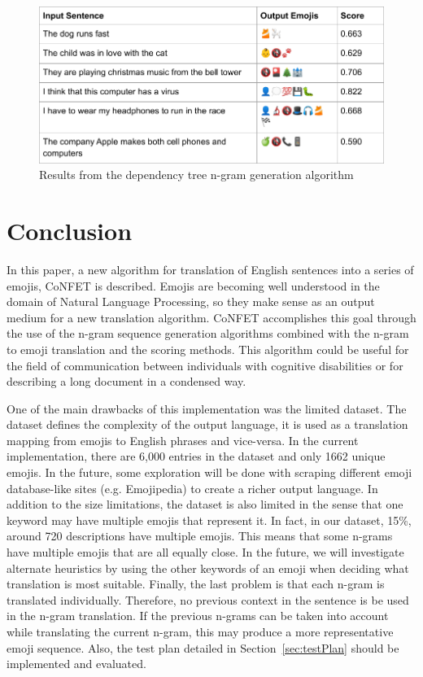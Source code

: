 \documentclass{article}[10]
\begin{document}
\begin{figure}[H]
  \begin{center}
    \includegraphics[width=\columnwidth]{figures/dependency.png}
      \caption{Results from the dependency tree n-gram generation algorithm\label{fig:dependency}}
  \end{center}
\end{figure}

\section{Conclusion}

In this paper, a new algorithm for translation of English sentences
into a series of emojis, CoNFET is described. Emojis are becoming well
understood in the domain of Natural Language Processing, so they make
sense as an output medium for a new translation algorithm. CoNFET
accomplishes this goal through the use of the n-gram sequence generation
algorithms combined with the n-gram to emoji translation and the scoring
methods. This algorithm could be useful for the field of communication
between individuals with cognitive disabilities or for describing a long
document in a condensed way.

One of the main drawbacks of this implementation was the
limited dataset. The dataset defines the complexity of the output
language, it is used as a translation mapping from emojis to English
phrases and vice-versa. In the current implementation, there are 6,000
entries in the dataset and only 1662 unique emojis. In the future, some
exploration will be done with scraping different emoji database-like
sites (e.g. Emojipedia) to create a richer output language. In addition
to the size limitations, the dataset is also limited in the sense that
one keyword may have multiple emojis that represent it. In fact, in our
dataset, 15\%, around 720 descriptions have multiple emojis. This means
that some n-grams have multiple emojis that are all equally close. In
the future, we will investigate alternate heuristics by using the other
keywords of an emoji when deciding what translation is most suitable.
Finally, the last problem is that each n-gram is translated
individually. Therefore, no previous context in the sentence is be used
in the n-gram translation. If the previous n-grams can be taken into
account while translating the current n-gram, this may produce a more
representative emoji sequence. Also, the test plan detailed in
Section~\ref{sec:testPlan} should be implemented and
evaluated.

\makeatother


\end{document}
